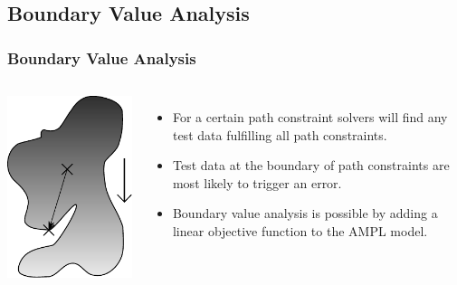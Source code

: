 \documentclass{beamer}
\begin{document}
\subsection{Boundary Value Analysis}
\begin{frame}
\frametitle{Boundary Value Analysis}
\begin{columns}[c]
	\includegraphics[width=\textwidth]{./pics/BVA.pdf}
	\begin{itemize}
\item For a certain path constraint solvers will find any test data fulfilling
all path constraints.
\item Test data at the boundary of path constraints are most likely to trigger
an error.
\item Boundary value analysis is possible by adding a linear objective function
to the AMPL model.
	\end{itemize}
\end{columns}
\end{frame}
\end{document}
